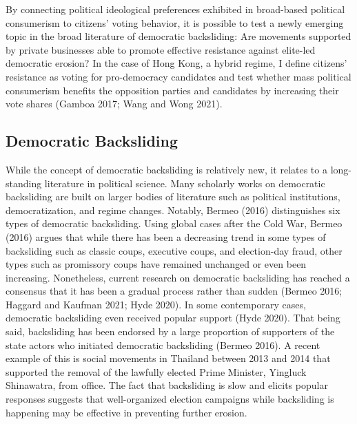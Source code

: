 \documentclass[letterpaper, 12pt]{article}
\begin{document}
By connecting political ideological preferences exhibited in broad-based political consumerism to citizens' voting behavior, it is possible to test a newly emerging topic in the broad literature of democratic backsliding: Are movements supported by private businesses able to promote effective resistance against elite-led democratic erosion? In the case of Hong Kong, a hybrid regime, I define citizens' resistance as voting for pro-democracy candidates and test whether mass political consumerism benefits the opposition parties and candidates by increasing their vote shares (Gamboa 2017; Wang and Wong 2021).


\subsection{Democratic Backsliding}
While the concept of democratic backsliding is relatively new, it relates to a long-standing literature in political science. Many scholarly works on democratic backsliding are built on larger bodies of literature such as political institutions, democratization, and regime changes. Notably, Bermeo (2016) distinguishes six types of democratic backsliding. Using global cases after the Cold War, Bermeo (2016) argues that while there has been a decreasing trend in some types of backsliding such as classic coups, executive coups, and election-day fraud, other types such as promissory coups have remained unchanged or even been increasing. Nonetheless, current research on democratic backsliding has reached a consensus that it has been a gradual process rather than sudden (Bermeo 2016; Haggard and Kaufman 2021; Hyde 2020). In some contemporary cases, democratic backsliding even received popular support (Hyde 2020). That being said, backsliding has been endorsed by a large proportion of supporters of the state actors who initiated democratic backsliding (Bermeo 2016). A recent example of this is social movements in Thailand between 2013 and 2014 that supported the removal of the lawfully elected Prime Minister, Yingluck Shinawatra, from office. The fact that backsliding is slow and elicits popular responses suggests that well-organized election campaigns while backsliding is happening may be effective in preventing further erosion.

\vspace{6pt}
\end{document}
